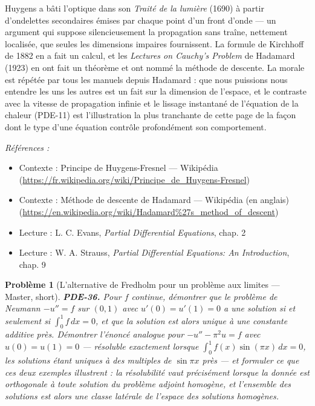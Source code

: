 \documentclass[11pt]{article}
\newtheorem{problem}{Problème}
\newenvironment{refs}{\par\small\noindent\emph{Références :}\begin{itemize}\setlength\itemsep{0pt}}{\end{itemize}\normalsize}
\begin{document}
\noindent Huygens a bâti l'optique dans son \textit{Traité de la lumière} (1690) à partir
d'ondelettes secondaires émises par chaque point d'un front d'onde --- un argument qui suppose
silencieusement la propagation sans traîne, nettement localisée, que seules les dimensions impaires
fournissent. La formule de Kirchhoff de 1882 en a fait un calcul, et les \textit{Lectures on Cauchy's
Problem} de Hadamard (1923) en ont fait un théorème et ont nommé la méthode de descente. La
morale est répétée par tous les manuels depuis Hadamard : que nous puissions nous entendre les uns
les autres est un fait sur la dimension de l'espace, et le contraste avec la vitesse de propagation
infinie et le lissage instantané de l'équation de la chaleur (PDE-11) est l'illustration la plus
tranchante de cette page de la façon dont le type d'une équation contrôle profondément son
comportement.

\begin{refs}
\item Contexte : Principe de Huygens-Fresnel --- Wikipédia (\url{https://fr.wikipedia.org/wiki/Principe_de_Huygens-Fresnel})
\item Contexte : Méthode de descente de Hadamard --- Wikipédia (en anglais) (\url{https://en.wikipedia.org/wiki/Hadamard%27s_method_of_descent})
\item Lecture : L. C. Evans, \textit{Partial Differential Equations}, chap. 2
\item Lecture : W. A. Strauss, \textit{Partial Differential Equations: An Introduction}, chap. 9
\end{refs}

\bigskip

\begin{problem}[{L'alternative de Fredholm pour un problème aux limites --- Master, short}]
\textbf{PDE-36.} Pour $f$ continue, démontrer que le problème de Neumann
$-u'' = f$ sur $(0,1)$ avec $u'(0) = u'(1) = 0$ a une solution si et seulement si
$\int_0^1 f\,dx = 0$, et que la solution est alors unique à une constante additive près.
Démontrer l'énoncé analogue pour $-u'' - \pi^2 u = f$ avec $u(0) = u(1) = 0$ --- résoluble
exactement lorsque $\int_0^1 f(x)\sin(\pi x)\,dx = 0$, les solutions étant uniques à des
multiples de $\sin \pi x$ près --- et formuler ce que ces deux exemples illustrent : la
résolubilité vaut précisément lorsque la donnée est orthogonale à toute solution du problème
adjoint homogène, et l'ensemble des solutions est alors une classe latérale de l'espace des
solutions homogènes.
\end{problem}
\end{document}
